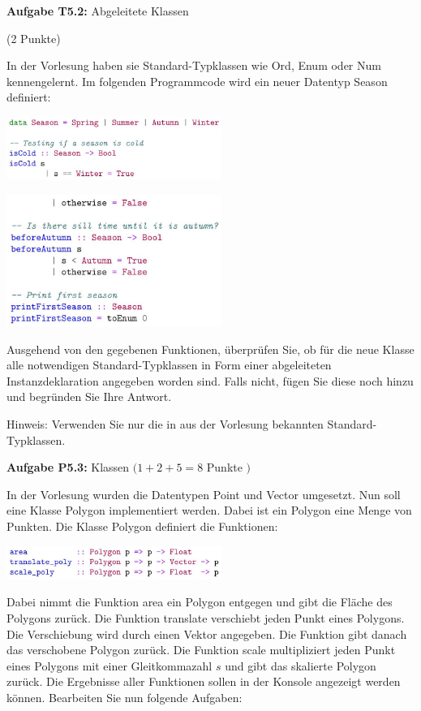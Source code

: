 \newpage

\textbf{Aufgabe T5.2:} Abgeleitete Klassen

(2 Punkte)

In der Vorlesung haben sie Standard-Typklassen wie Ord, Enum oder Num kennengelernt. Im folgenden Programmcode wird ein neuer 
Datentyp Season definiert:

\includegraphics[width=7cm]{2022_11_15_0a5a2eee0aef383b0ce9g-1(1)}

\includegraphics[width=7cm]{2022_11_15_0a5a2eee0aef383b0ce9g-2}

Ausgehend von den gegebenen Funktionen, überprüfen Sie, ob für die neue Klasse alle notwendigen Standard-Typklassen in Form 
einer abgeleiteten Instanzdeklaration angegeben worden sind. Falls nicht, fügen Sie diese noch hinzu und begründen Sie Ihre Antwort.

Hinweis: Verwenden Sie nur die in aus der Vorlesung bekannten Standard-Typklassen.

\newpage

\textbf{Aufgabe P5.3:} Klassen $(1+2+5=8$ Punkte $)$

In der Vorlesung wurden die Datentypen Point und Vector umgesetzt. Nun soll eine Klasse Polygon implementiert werden. 
Dabei ist ein Polygon eine Menge von Punkten. Die Klasse Polygon definiert die Funktionen:

\includegraphics[width=7cm]{2022_11_15_0a5a2eee0aef383b0ce9g-2(1)}

Dabei nimmt die Funktion area ein Polygon entgegen und gibt die Fläche des Polygons zurück. Die Funktion translate 
verschiebt jeden Punkt eines Polygons. Die Verschiebung wird durch einen Vektor angegeben. Die Funktion gibt danach das verschobene 
Polygon zurück. Die Funktion scale multipliziert jeden Punkt eines Polygons mit einer Gleitkommazahl $s$ und gibt das skalierte Polygon 
zurück. Die Ergebnisse aller Funktionen sollen in der Konsole angezeigt werden können. Bearbeiten Sie nun folgende Aufgaben:

